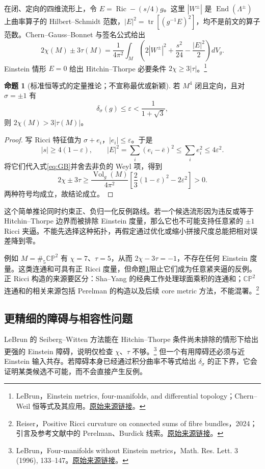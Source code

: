 \documentclass[11pt,a4paper]{article}
\theoremstyle{definition}
\newtheorem{proposition}[definition]{命题}
\newcommand{\Ric}{\operatorname{Ric}}
\newcommand{\Vol}{\operatorname{Vol}}
\newcommand{\tr}{\operatorname{tr}}
\newcommand{\src}[3]{\footnote{\raggedright #1，#2。\href{#3}{原始来源链接}。}}
\begin{document}
在闭、定向的四维流形上，令 $E=\Ric-(s/4)g$。这里 $|W^\pm|$ 是 $\operatorname{End}(\Lambda^\pm)$ 上曲率算子的 Hilbert--Schmidt 范数，$|E|^2=\tr[(g^{-1}E)^2]$，均不是前文的算子范数。Chern--Gauss--Bonnet 与签名公式给出
\begin{equation}\label{eq:GB}
2\chi(M)\pm3\tau(M)=\frac1{4\pi^2}\int_M
\left(2|W^\pm|^2+\frac{s^2}{24}-\frac{|E|^2}{2}\right)dV_g.
\end{equation}
Einstein 情形 $E=0$ 给出 Hitchin--Thorpe 必要条件 $2\chi\ge3|\tau|$。\src{LeBrun}{Einstein metrics, four-manifolds, and differential topology；Chern--Weil 恒等式及其应用}{https://arxiv.org/abs/math/0404359}

\begin{proposition}[标准恒等式的定量推论；不宣称最优或新颖]\label{prop:gap}
若 $M^4$ 闭且定向，且对 $\sigma=\pm1$ 有
\[
\delta_\sigma(g)\le\varepsilon<\frac{1}{1+\sqrt3},
\]
则 $2\chi(M)>3|\tau(M)|$。
\end{proposition}

\begin{proof}
写 Ricci 特征值为 $\sigma+e_i$，$|e_i|\le\varepsilon$。于是
\[
|s|\ge4(1-\varepsilon),\qquad
|E|^2=\sum_i(e_i-\bar e)^2\le\sum_i e_i^2\le4\varepsilon^2.
\]
将它们代入式\eqref{eq:GB}并舍去非负的 Weyl 项，得到
\[
2\chi\pm3\tau\ge\frac{\Vol_g(M)}{4\pi^2}
\left[\frac23(1-\varepsilon)^2-2\varepsilon^2\right]>0.
\]
两种符号均成立，故结论成立。
\end{proof}

这个简单推论同时约束正、负归一化反例路线。若一个候选流形因为违反或等于 Hitchin--Thorpe 边界而被排除 Einstein 度量，那么它也不可能支持任意紧的 $\pm1$ Ricci 夹逼。不能先选择这种拓扑，再假定通过优化或缩小拼接尺度总能把相对误差降到零。

例如 $M=\#_5\mathbb{CP}^2$ 有 $\chi=7$、$\tau=5$，从而 $2\chi-3\tau=-1$，不存在任何 Einstein 度量。这类连通和可具有正 Ricci 度量，但命题\ref{prop:gap}阻止它们成为任意紧夹逼的反例。正 Ricci 构造的来源要区分：Sha--Yang 的经典工作处理球面乘积的连通和；$\mathbb{CP}^2$ 连通和的相关来源包括 Perelman 的构造以及后续 core metric 方法，不能混署。\src{Reiser}{Positive Ricci curvature on connected sums of fibre bundles，2024；引言及参考文献中的 Perelman、Burdick 线索}{https://arxiv.org/abs/2406.02274}

\subsection{更精细的障碍与相容性问题}

LeBrun 的 Seiberg--Witten 方法能在 Hitchin--Thorpe 条件尚未排除的情形下给出更强的 Einstein 障碍，说明仅检查 $\chi$、$\tau$ 不够。\src{LeBrun}{Four-manifolds without Einstein metrics，Math. Res. Lett. 3 (1996), 133--147}{https://arxiv.org/abs/dg-ga/9511015}
但一个有用障碍还必须与近 Einstein 输入共存。若障碍本身已经通过积分曲率不等式给出 $\delta_\sigma$ 的正下界，它会证明某类候选不可能，而不会直接产生反例。
\end{document}
